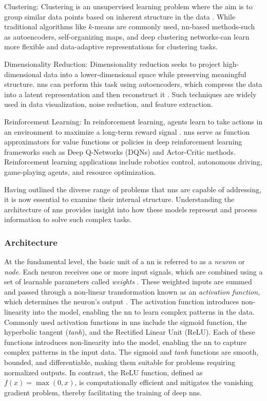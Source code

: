 Clustering: Clustering is an unsupervised learning problem where the aim is to group similar data points based on inherent structure in the data \parencite{aljalbout2018clustering}. While traditional algorithms like $k$-means are commonly used, \ac{nn}-based methods-such as autoencoders, self-organizing maps, and deep clustering networks-can learn more flexible and data-adaptive representations for clustering tasks.

Dimensionality Reduction: Dimensionality reduction seeks to project high-dimensional data into a lower-dimensional space while preserving meaningful structure. \ac{nn}s can perform this task using autoencoders, which compress the data into a latent representation and then reconstruct it \parencite{hinton2006dimensionalityreduction}. Such techniques are widely used in data visualization, noise reduction, and feature extraction.

Reinforcement Learning: In reinforcement learning, agents learn to take actions in an environment to maximize a long-term reward signal \parencite[pp.~2--3]{sutton2015reinforcement}. \ac{nn}s serve as function approximators for value functions or policies in deep reinforcement learning frameworks such as Deep Q-Networks (DQNs) and Actor-Critic methods. Reinforcement learning  applications include robotics control, autonomous driving, game-playing agents, and resource optimization.

Having outlined the diverse range of problems that \ac{nn}s are capable of addressing, it is now essential to examine their internal structure. Understanding the architecture of \ac{nn}s provides insight into how these models represent and process information to solve such complex tasks.

\subsubsection{Architecture}
At the fundamental level, the basic unit of a \ac{nn} is referred to as a \textit{neuron} or \textit{node}. Each neuron receives one or more input signals, which are combined using a set of learnable parameters called \textit{weights} \parencite[p.~4]{mienye2024nncomprehensivereview}. These weighted inputs are summed and passed through a non-linear transformation known as an \textit{activation function}, which determines the neuron's output \parencite[pp.~4--5]{mienye2024nncomprehensivereview}. The activation function introduces non-linearity into the model, enabling the \ac{nn} to learn complex patterns in the data. Commonly used activation functions in \ac{nn}s include the sigmoid function, the hyperbolic tangent (\textit{\ac{tanh}}), and the Rectified Linear Unit (ReLU). Each of these functions introduces non-linearity into the model, enabling the \ac{nn} to capture complex patterns in the input data. The sigmoid and \textit{\ac{tanh}} functions are smooth, bounded, and differentiable, making them suitable for problems requiring normalized outputs. In contrast, the ReLU function, defined as $f(x) = \max(0, x)$, is computationally efficient and mitigates the vanishing gradient problem, thereby facilitating the training of deep \ac{nn}s.


